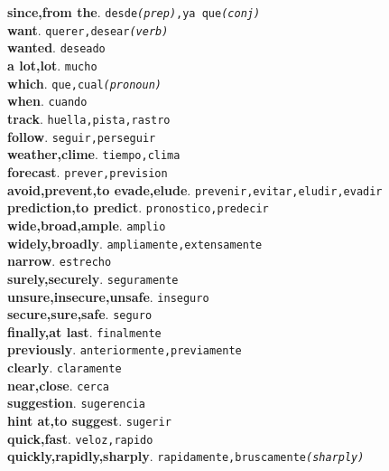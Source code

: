 \documentclass[twocolumn]{article}
\begin{document}
	\textsf{\textbf{since,from the}}. \texttt{desde{\scriptsize \textit{(prep)}},ya que{\scriptsize \textit{(conj)}}}\\
	\textsf{\textbf{want}}. \texttt{querer,desear{\scriptsize \textit{(verb)}}}\\
	\textsf{\textbf{wanted}}. \texttt{deseado}\\
	\textsf{\textbf{a lot,lot}}. \texttt{mucho}\\
	\textsf{\textbf{which}}. \texttt{que,cual{\scriptsize \textit{(pronoun)}}}\\
	\textsf{\textbf{when}}. \texttt{cuando}\\
	\textsf{\textbf{track}}. \texttt{huella,pista,rastro}\\
	\textsf{\textbf{follow}}. \texttt{seguir,perseguir}\\
	\textsf{\textbf{weather,clime}}. \texttt{tiempo,clima}\\
	\textsf{\textbf{forecast}}. \texttt{prever,prevision}\\
	\textsf{\textbf{avoid,prevent,to evade,elude}}. \texttt{prevenir,evitar,eludir,evadir}\\
	\textsf{\textbf{prediction,to predict}}. \texttt{pronostico,predecir}\\
	\textsf{\textbf{wide,broad,ample}}. \texttt{amplio}\\
	\textsf{\textbf{widely,broadly}}. \texttt{ampliamente,extensamente}\\
	\textsf{\textbf{narrow}}. \texttt{estrecho}\\
	\textsf{\textbf{surely,securely}}. \texttt{seguramente}\\
	\textsf{\textbf{unsure,insecure,unsafe}}. \texttt{inseguro}\\
	\textsf{\textbf{secure,sure,safe}}. \texttt{seguro}\\
	\textsf{\textbf{finally,at last}}. \texttt{finalmente}\\
	\textsf{\textbf{previously}}. \texttt{anteriormente,previamente}\\
	\textsf{\textbf{clearly}}. \texttt{claramente}\\
	\textsf{\textbf{near,close}}. \texttt{cerca}\\
	\textsf{\textbf{suggestion}}. \texttt{sugerencia}\\
	\textsf{\textbf{hint at,to suggest}}. \texttt{sugerir}\\
	\textsf{\textbf{quick,fast}}. \texttt{veloz,rapido}\\
	\textsf{\textbf{quickly,rapidly,sharply}}. \texttt{rapidamente,bruscamente{\scriptsize \textit{(sharply)}}}\\
\end{document}
